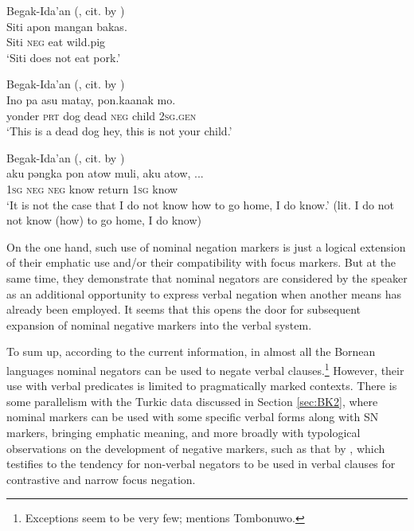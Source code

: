 \documentclass[output=paper]{langsci/langscibook}
\begin{document}
\ea Begak-Ida’an (\citealp[300]{goudswaard2005a}, cit. by \citealp[15]{kroeger2014a}) \label{ex:BK63}\\
	\gll Siti		apon	mangan	bakas.\\
	Siti		\textsc{neg}	eat		wild.pig\\
	\glt `Siti does not eat pork.'
\z

\ea Begak-Ida’an (\citealp[304]{goudswaard2005a}, cit. by \citealp[15]{kroeger2014a}) \label{ex:BK64}\\
	\gll Ino			pa		asu	matay,	pon.ka\footnotemark	anak	mo.\\
	yonder	\textsc{prt}	dog	dead		\textsc{neg}		child	\textsc{2sg.gen}\\
	\glt `This is a dead dog hey, this is not your child.'\footnotemark
\z



\ea Begak-Ida’an (\citealp[305]{goudswaard2005a}, cit. by \citealp[16]{kroeger2014a}) \label{ex:BK65}\\
	\gll aku	pǝngka	pon	atow		muli,		aku	atow, ...\\
	\textsc{1sg}	\textsc{neg}		\textsc{neg}	know		return	\textsc{1sg}	know\\
	\glt `It is not the case that I do not know how to go home, I do know.' (lit. I do not not know (how) to go home, I do know)
\z


On the one hand, such use of nominal negation markers is just a logical extension of their emphatic use and/or their compatibility with focus markers. But at the same time, they demonstrate that nominal negators are considered by the speaker as an additional opportunity to express verbal negation when another means has already been employed. It seems that this opens the door for subsequent expansion of nominal negative markers into the verbal system.

To sum up, according to the current information, in almost all the Bornean languages nominal negators can be used to negate verbal clauses.\footnote{Exceptions seem to be very few; \citet{kroeger2014a} mentions Tombonuwo.} However, their use with verbal predicates is limited to pragmatically marked contexts. There is some parallelism with the Turkic data discussed in Section \ref{sec:BK2}, where nominal markers can be used with some specific verbal forms along with SN markers, bringing emphatic meaning, and more broadly with typological observations on the development of negative markers, such as that by \citet{Horn1989}, which testifies to the tendency for non-verbal negators to be used in verbal clauses for contrastive and narrow focus negation.
\end{document}
